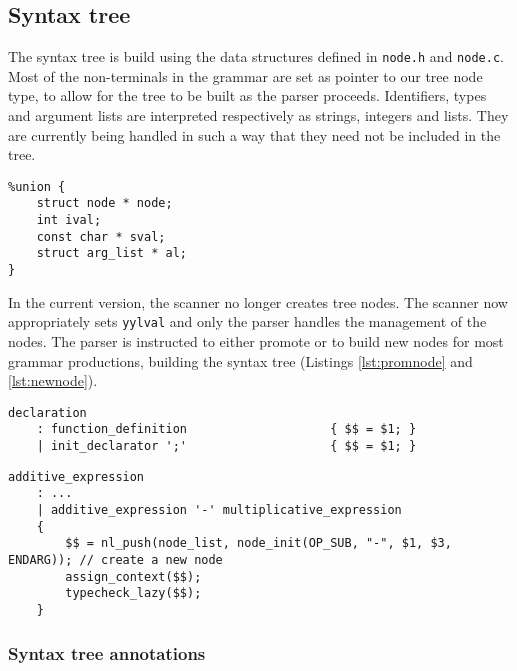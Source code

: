 
\subsection{Syntax tree}
The syntax tree is build using the data structures defined in \texttt{node.h} and \texttt{node.c}.
Most of the non-terminals in the grammar are set as pointer to our tree node type, to allow for the
tree to be built as the parser proceeds. Identifiers, types and argument lists are interpreted
respectively as strings, integers and lists. They are currently being handled in such a way
that they need not be included in the tree.

\begin{lstlisting}
%union {
	struct node * node;
	int ival;
	const char * sval;
	struct arg_list * al;
}
\end{lstlisting}

In the current version, the scanner no longer creates tree nodes. The scanner now
appropriately sets \texttt{yylval} and only the parser handles the management of
the nodes. The parser is instructed to either promote or to build new nodes for
most grammar productions, building the syntax tree (Listings \ref{lst:promnode} and \ref{lst:newnode}).

\begin{lstlisting}[caption={Example of parser rules where nodes are promoted.
This procedure is preformed for productions in which there is no need to create a
new node, since no new information would be gained in doing so.},label={lst:promnode},captionpos=b]
declaration
	: function_definition                    { $$ = $1; }
	| init_declarator ';'                    { $$ = $1; }
\end{lstlisting}

\begin{lstlisting}[caption={Example of a parser rule where a new nodes is
created. Here, we will need to type check and evaluate both operands of
the expression, before we know what attributes will be assigned to the head
of the rule.},label={lst:newnode},captionpos=b]
additive_expression
	: ...
	| additive_expression '-' multiplicative_expression
	{
		$$ = nl_push(node_list, node_init(OP_SUB, "-", $1, $3, ENDARG)); // create a new node
		assign_context($$);
		typecheck_lazy($$);
	}
\end{lstlisting}


\subsubsection{Syntax tree annotations}

